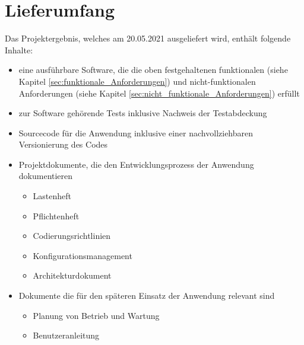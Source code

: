 \chapter{Lieferumfang}
Das Projektergebnis, welches am 20.05.2021 ausgeliefert wird, enthält folgende Inhalte:
\begin{itemize}
\item eine ausführbare Software, die die oben festgehaltenen funktionalen (siehe Kapitel \ref{sec:funktionale_Anforderungen}) und nicht-funktionalen Anforderungen (siehe Kapitel \ref{sec:nicht_funktionale_Anforderungen}) erfüllt
\item zur Software gehörende Tests inklusive Nachweis der Testabdeckung
\item Sourcecode für die Anwendung inklusive einer nachvollziehbaren Versionierung des Codes
\item Projektdokumente, die den Entwicklungsprozess der Anwendung dokumentieren
	\begin{itemize}
		\item Lastenheft
		\item Pflichtenheft
		\item Codierungsrichtlinien
		\item Konfigurationsmanagement
		\item Architekturdokument
	\end{itemize} 
\item Dokumente die für den späteren Einsatz der Anwendung relevant sind
	\begin{itemize}
		\item Planung von Betrieb und Wartung
		\item Benutzeranleitung
	\end{itemize}
\end{itemize}